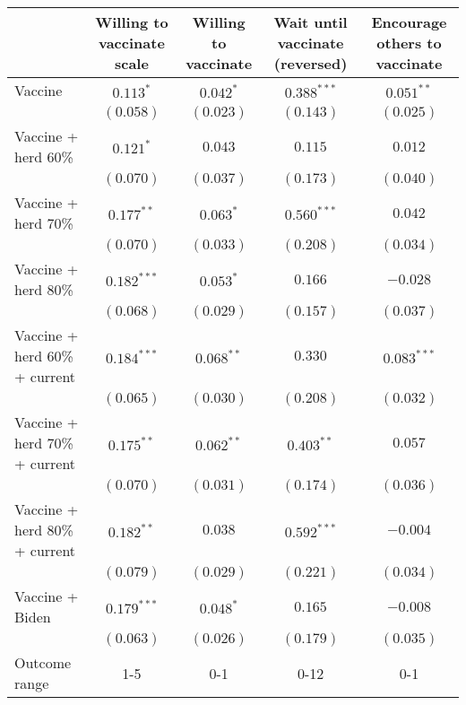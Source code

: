 \begin{table}
\begin{center}
\begin{tabular}{l c c c c}
\hline
 & Willing to vaccinate scale & Willing to vaccinate & Wait until vaccinate (reversed) & Encourage others to vaccinate \\
\hline
Vaccine                       & $0.113^{*}$   & $0.042^{*}$  & $0.388^{***}$ & $0.051^{**}$  \\
                              & $(0.058)$     & $(0.023)$    & $(0.143)$     & $(0.025)$     \\
Vaccine + herd 60\%           & $0.121^{*}$   & $0.043$      & $0.115$       & $0.012$       \\
                              & $(0.070)$     & $(0.037)$    & $(0.173)$     & $(0.040)$     \\
Vaccine + herd 70\%           & $0.177^{**}$  & $0.063^{*}$  & $0.560^{***}$ & $0.042$       \\
                              & $(0.070)$     & $(0.033)$    & $(0.208)$     & $(0.034)$     \\
Vaccine + herd 80\%           & $0.182^{***}$ & $0.053^{*}$  & $0.166$       & $-0.028$      \\
                              & $(0.068)$     & $(0.029)$    & $(0.157)$     & $(0.037)$     \\
Vaccine + herd 60\% + current & $0.184^{***}$ & $0.068^{**}$ & $0.330$       & $0.083^{***}$ \\
                              & $(0.065)$     & $(0.030)$    & $(0.208)$     & $(0.032)$     \\
Vaccine + herd 70\% + current & $0.175^{**}$  & $0.062^{**}$ & $0.403^{**}$  & $0.057$       \\
                              & $(0.070)$     & $(0.031)$    & $(0.174)$     & $(0.036)$     \\
Vaccine + herd 80\% + current & $0.182^{**}$  & $0.038$      & $0.592^{***}$ & $-0.004$      \\
                              & $(0.079)$     & $(0.029)$    & $(0.221)$     & $(0.034)$     \\
Vaccine + Biden               & $0.179^{***}$ & $0.048^{*}$  & $0.165$       & $-0.008$      \\
                              & $(0.063)$     & $(0.026)$    & $(0.179)$     & $(0.035)$     \\
\hline
Outcome range                 & 1-5           & 0-1          & 0-12          & 0-1           \\

\end{tabular}
\end{center}
\end{table}
